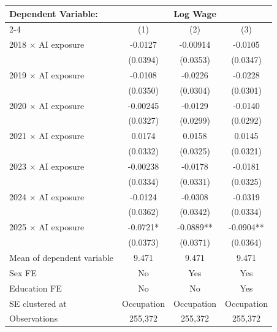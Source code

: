 \def\sym#1{\ifmmode^{#1}\else\(^{#1}\)\fi}
\begin{tabular}{l*{3}{c}}
\toprule
Dependent Variable: & \multicolumn{3}{c}{Log Wage} \\
\cmidrule(lr){2-4}
 & (1) & (2) & (3) \\
\midrule
2018 $\times$ AI exposure&     -0.0127   &    -0.00914   &     -0.0105   \\
            &    (0.0394)   &    (0.0353)   &    (0.0347)   \\
2019 $\times$ AI exposure&     -0.0108   &     -0.0226   &     -0.0228   \\
            &    (0.0350)   &    (0.0304)   &    (0.0301)   \\
2020 $\times$ AI exposure&    -0.00245   &     -0.0129   &     -0.0140   \\
            &    (0.0327)   &    (0.0299)   &    (0.0292)   \\
2021 $\times$ AI exposure&      0.0174   &      0.0158   &      0.0145   \\
            &    (0.0332)   &    (0.0325)   &    (0.0321)   \\
2023 $\times$ AI exposure&    -0.00238   &     -0.0178   &     -0.0181   \\
            &    (0.0334)   &    (0.0331)   &    (0.0325)   \\
2024 $\times$ AI exposure&     -0.0124   &     -0.0308   &     -0.0319   \\
            &    (0.0362)   &    (0.0342)   &    (0.0334)   \\
2025 $\times$ AI exposure&     -0.0721*  &     -0.0889** &     -0.0904** \\
            &    (0.0373)   &    (0.0371)   &    (0.0364)   \\
\midrule
Mean of dependent variable&       9.471   &       9.471   &       9.471   \\
Sex FE      &          No   &         Yes   &         Yes   \\
Education FE&          No   &          No   &         Yes   \\
SE clustered at&  Occupation   &  Occupation   &  Occupation   \\
Observations&     255,372   &     255,372   &     255,372   \\
\bottomrule
\end{tabular}
